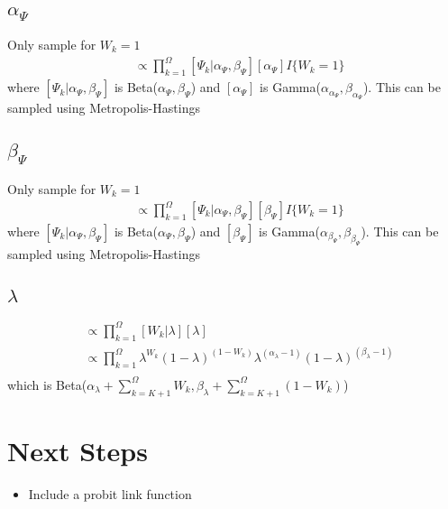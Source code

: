 \documentclass[fleqn]{article}
\begin{document}
\subsection{$\alpha_\Psi$}
%
Only sample for $W_k = 1$
%
\begin{align*}
  [\alpha_\Psi | \cdot] & \propto \prod_{k = 1}^\Omega [\Psi_k | \alpha_\Psi, \beta_\Psi] [\alpha_\Psi] I\{W_k = 1\}
\end{align*}
where $[\Psi_k | \alpha_\Psi, \beta_\Psi]$ is Beta($\alpha_\Psi, \beta_\Psi$) and $[\alpha_\Psi]$ is Gamma($\alpha_{\alpha_\Psi}, \beta_{\alpha_\Psi}$). This can be sampled using Metropolis-Hastings
%
\subsection{$\beta_\Psi$}
%
Only sample for $W_k = 1$
%
\begin{align*}
  [\beta_\Psi | \cdot] & \propto \prod_{k = 1}^\Omega [\Psi_k | \alpha_\Psi, \beta_\Psi] [\beta_\Psi] I\{W_k = 1\}
\end{align*}
where $[\Psi_k | \alpha_\Psi, \beta_\Psi]$ is Beta($\alpha_\Psi, \beta_\Psi$) and $[\beta_\Psi]$ is Gamma($\alpha_{\beta_\Psi}, \beta_{\beta_\Psi}$). This can be sampled using Metropolis-Hastings
%
\subsection{$\lambda$}
%
\begin{align*}
  [\lambda | \cdot ] & \propto \prod_{k = 1}^\Omega [W_k | \lambda] [\lambda]\\
  & \propto  \prod_{k = 1}^\Omega \lambda^{W_k} (1 - \lambda)^{(1 - W_k)} \lambda^{(\alpha_\lambda - 1)} (1 - \lambda)^{(\beta_\lambda - 1)}\\
\end{align*}
%
which is Beta($\alpha_\lambda + \sum_{k = K + 1}^\Omega W_k, \beta_\lambda + \sum_{k = K + 1}^\Omega (1 - W_k)$)
%
\section{Next Steps}
\begin{itemize}
  \item Include a probit link function
\end{itemize}
\end{document}
